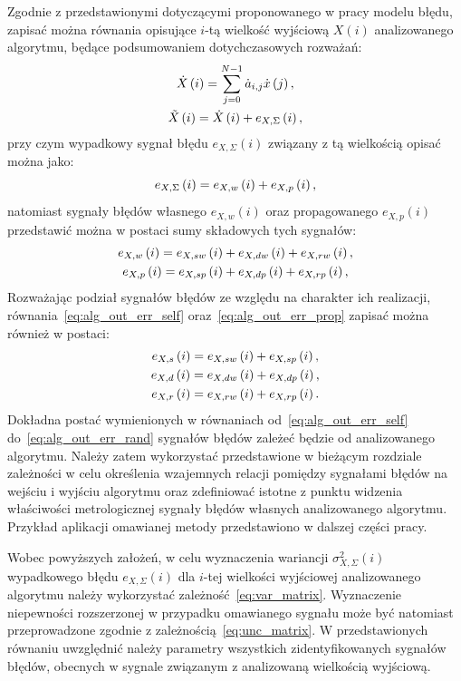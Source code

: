 Zgodnie z przedstawionymi dotyczącymi proponowanego w pracy modelu błędu, zapisać można równania opisujące $i$-tą wielkość wyjściową $X(i)$ analizowanego algorytmu, będące podsumowaniem dotychczasowych rozważań:
\begin{gather}
\dot{X} \left(i\right) = \sum _{j = 0} ^{N-1} \dot{a}_{i,j} \dot{x} \left(j\right) \label{eq:alg_out_ideal}, \\
\tilde{X} \left(i\right) = \dot{X} \left(i\right) + e_{X,\Sigma} \left(i\right) \label{eq:alg_out_real},
\end{gather}
przy czym wypadkowy sygnał błędu $e_{X,\Sigma}(i)$ związany z tą wielkością opisać można jako:
\begin{equation}
e_{X,\Sigma} \left(i\right) = e_{X,w} \left(i\right) + e_{X,p} \left(i\right) \label{eq:alg_out_err},
\end{equation}
natomiast sygnały błędów własnego $e_{X,w}(i)$ oraz propagowanego $e_{X,p}(i)$ przedstawić można w postaci sumy składowych tych sygnałów:
\begin{gather}
e_{X,w} \left(i\right) = e_{X,sw} \left(i\right) + e_{X,dw} \left(i\right) + e_{X,rw} \left(i\right) \label{eq:alg_out_err_self}, \\
e_{X,p} \left(i\right) = e_{X,sp} \left(i\right) + e_{X,dp} \left(i\right) + e_{X,rp} \left(i\right) \label{eq:alg_out_err_prop},
\end{gather}
Rozważając podział sygnałów błędów ze względu na charakter ich realizacji, równania~\eqref{eq:alg_out_err_self} oraz~\eqref{eq:alg_out_err_prop} zapisać można również w postaci:
\begin{gather}
e_{X,s} \left(i\right) = e_{X,sw} \left(i\right) + e_{X,sp} \left(i\right) \label{eq:alg_out_err_stat}, \\
e_{X,d} \left(i\right) = e_{X,dw} \left(i\right) + e_{X,dp} \left(i\right) \label{eq:alg_out_err_dyn}, \\
e_{X,r} \left(i\right) = e_{X,rw} \left(i\right) + e_{X,rp} \left(i\right) \label{eq:alg_out_err_rand}.
\end{gather}
Dokładna postać wymienionych w równaniach od~\eqref{eq:alg_out_err_self} do~\eqref{eq:alg_out_err_rand} sygnałów błędów zależeć będzie od analizowanego algorytmu. Należy zatem wykorzystać przedstawione w bieżącym rozdziale zależności w celu określenia wzajemnych relacji pomiędzy sygnałami błędów na wejściu i wyjściu algorytmu oraz zdefiniować istotne z punktu widzenia właściwości metrologicznej sygnały błędów własnych analizowanego algorytmu. Przykład aplikacji omawianej metody przedstawiono w dalszej części pracy.

Wobec powyższych założeń, w celu wyznaczenia wariancji $\sigma_{X,\Sigma}^{2}(i)$ wypadkowego błędu $e_{X,\Sigma}(i)$ dla $i$-tej wielkości wyjściowej analizowanego algorytmu należy wykorzystać zależność~\eqref{eq:var_matrix}. Wyznaczenie niepewności rozszerzonej w przypadku omawianego sygnału może być natomiast przeprowadzone zgodnie z zależnością~\eqref{eq:unc_matrix}. W przedstawionych równaniu uwzględnić należy parametry wszystkich zidentyfikowanych sygnałów błędów, obecnych w sygnale związanym z analizowaną wielkością wyjściową.

